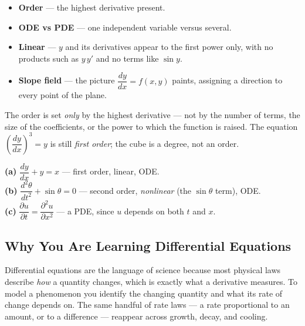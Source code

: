 \documentclass[11pt]{article}
\begin{document}
\begin{formulabox}
\begin{itemize}[leftmargin=1.4em, itemsep=2pt]
    \item \textbf{Order} --- the highest derivative present.
    \item \textbf{ODE vs PDE} --- one independent variable versus several.
    \item \textbf{Linear} --- $y$ and its derivatives appear to the first power
          only, with no products such as $y\,y'$ and no terms like $\sin y$.
    \item \textbf{Slope field} --- the picture $\dfrac{dy}{dx} = f(x,y)$ paints,
          assigning a direction to every point of the plane.
\end{itemize}
\end{formulabox}

\begin{warningbox}
The order is set \emph{only} by the highest derivative --- not by the number of
terms, the size of the coefficients, or the power to which the function is
raised. The equation $\left(\dfrac{dy}{dx}\right)^{3} = y$ is still
\emph{first order}; the cube is a degree, not an order.
\end{warningbox}

\begin{examplebox}
\textbf{(a)} $\dfrac{dy}{dx} + y = x$ --- first order, linear, ODE.\\
\textbf{(b)} $\dfrac{d^{2}\theta}{dt^{2}} + \sin\theta = 0$ --- second order,
\emph{nonlinear} (the $\sin\theta$ term), ODE.\\
\textbf{(c)} $\dfrac{\partial u}{\partial t} = \dfrac{\partial^{2} u}{\partial x^{2}}$
--- a PDE, since $u$ depends on both $t$ and $x$.
\end{examplebox}

\subsection{Why You Are Learning Differential Equations}

Differential equations are the language of science because most physical laws
describe \emph{how} a quantity changes, which is exactly what a derivative
measures. To model a phenomenon you identify the changing quantity and what its
rate of change depends on. The same handful of rate laws --- a rate proportional
to an amount, or to a difference --- reappear across growth, decay, and cooling.
\end{document}
